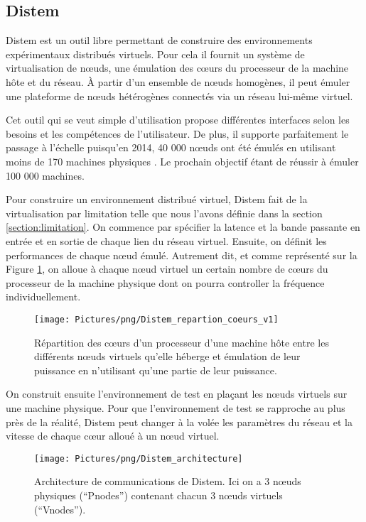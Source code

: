 \subsection{Distem}
\label{subsection:Distem}

Distem \citep{DISTEM} est un outil libre permettant de construire des
environnements expérimentaux distribués virtuels. Pour cela il fournit un
système de virtualisation de n\oe uds, une émulation des c\oe urs du processeur
de la machine hôte et du réseau. À partir d'un ensemble de n\oe uds homogènes,
il peut émuler une plateforme de n\oe uds hétérogènes connectés via un réseau
lui-même virtuel.

Cet outil qui se veut simple d'utilisation propose différentes interfaces selon
les besoins et les compétences de l'utilisateur. De plus, il supporte
parfaitement le passage à l'échelle puisqu'en 2014, 40 000 n\oe uds ont été
émulés en utilisant moins de 170 machines physiques
\citep{DISTEM_buchert2014emulation}. Le prochain objectif étant de réussir à
émuler 100 000 machines.

Pour construire un environnement distribué virtuel, Distem fait de la
virtualisation par limitation telle que nous l'avons définie dans la section
\ref{section:limitation}. On commence par spécifier la latence et la bande
passante en entrée et en sortie de chaque lien du réseau virtuel. Ensuite, on
définit les performances de chaque n\oe ud émulé. Autrement dit, et comme
représenté sur la Figure \ref{Distem_core}, on alloue à chaque n\oe ud virtuel
un certain nombre de c\oe urs du processeur de la machine physique dont on
pourra controller la fréquence individuellement.

\begin{figure}[H]
  \centering
  \texttt{[image: Pictures/png/Distem\_repartion\_coeurs\_v1]}
  \caption{Répartition des c\oe urs d'un processeur d'une machine hôte entre les différents n\oe uds virtuels qu'elle héberge et émulation de leur puissance en n'utilisant qu'une partie de leur puissance.}
  \label{Distem_core}
\end{figure}
  
On construit ensuite l'environnement de test en plaçant les n\oe uds virtuels
sur une machine physique. Pour que l'environnement de test se rapproche au plus
près de la réalité, Distem peut changer à la volée les paramètres du réseau et
la vitesse de chaque c\oe ur alloué à un n\oe ud virtuel.

\begin{figure}
  \centering
  \texttt{[image: Pictures/png/Distem\_architecture]}
  \caption{Architecture de communications de Distem. Ici on a 3 n\oe uds physiques (``Pnodes'') contenant chacun 3 n\oe uds virtuels (``Vnodes'').}
  \label{Distem_archi}
\end{figure}

